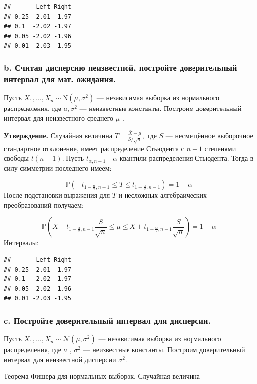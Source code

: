 \documentclass[]{article}
\begin{document}
\begin{verbatim}
##       Left Right
## 0.25 -2.01 -1.97
## 0.1  -2.02 -1.97
## 0.05 -2.02 -1.96
## 0.01 -2.03 -1.95
\end{verbatim}

\subsubsection{b. Считая дисперсию неизвестной, постройте доверительный
интервал для мат. ожидания.}\label{b.--------.-.}

Пусть \(X_{1},\ldots ,X_{n}\sim \mathrm {N} (\mu ,\sigma ^{2})\) ---
независимая выборка из нормального распределения, где
\(\mu ,\sigma ^{2}\) --- неизвестные константы. Построим доверительный
интервал для неизвестного среднего \(\mu\) .

\textbf{Утверждение.} Случайная величина
\(T={\frac {{\bar {X}}-\mu }{S/{\sqrt {n}}}},\) где \(S\) ---
несмещённое выборочное стандартное отклонение, имеет распределение
Стьюдента с \(n-1\) степенями свободы \(t(n-1)\). Пусть
\({\displaystyle t_{\alpha ,n-1}}\) - \({\displaystyle \alpha }\)
квантили распределения Стьюдента. Тогда в силу симметрии последнего
имеем:

\[\mathbb {P} \left(-t_{1-{\frac {\alpha }{2}},n-1}\leq T\leq t_{1-{\frac {\alpha }{2}},n-1}\right)=1-\alpha \]
После подстановки выражения для \(T\) и несложных алгебраических
преобразований получаем:

\[\mathbb {P} \left({\bar {X}}-t_{1-{\frac {\alpha }{2}},n-1}{\frac {S}{\sqrt {n}}}\leq \mu \leq {\bar {X}}+t_{1-{\frac {\alpha }{2}},n-1}{\frac {S}{\sqrt {n}}}\right)=1-\alpha\]
Интервалы:

\begin{verbatim}
##       Left Right
## 0.25 -2.01 -1.97
## 0.1  -2.02 -1.97
## 0.05 -2.02 -1.96
## 0.01 -2.03 -1.95
\end{verbatim}

\subsubsection{c. Постройте доверительный интервал для
дисперсии.}\label{c.-----.}

Пусть \(X_{1},\ldots ,X_{n}\sim {\mathcal {N}}(\mu ,\sigma ^{2})\) ---
независимая выборка из нормального распределения, где \(\mu\) ,
\(\sigma ^{2}\) --- неизвестные константы. Построим доверительный
интервал для неизвестной дисперсии \(\sigma ^{2}\).

Теорема Фишера для нормальных выборок. Случайная величина
\end{document}
